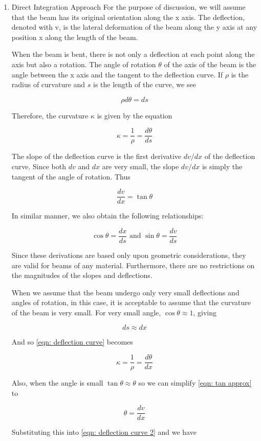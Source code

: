 \documentclass[a4paper,openany,12pt]{book}
\begin{document}
\begin{enumerate}
\item Direct Integration Approach
\label{direct-integration-approach}
For the purpose of discussion, we will assume that the beam has its
original orientation along the x axis. The deflection, denoted with v,
is the lateral deformation of the beam along the y axis at any position
x along the length of the beam.

When the beam is bent, there is not only a deflection at each point
along the axis but also a rotation. The angle of rotation \(\theta\) of
the axis of the beam is the angle between the x axis and the tangent to
the deflection curve. If \(\rho\) is the radius of curvature and \(s\) is
the length of the curve, we see


$$\rho d\theta  = ds$$

Therefore, the curvature \(\kappa\) is given by the equation

$$ \kappa  = \frac{1}{\rho } = \frac{d\theta }{ds}$$

The slope of the deflection curve is the first derivative \(dv/dx\) of the
deflection curve. Since both \(dv\) and \(dx\) are very small, the slope
\(dv/dx\) is simply the tangent of the angle of rotation. Thus

$$ \frac{dv}{dx} = \tan \theta$$

In similar manner, we also obtain the following relationships:

$$\cos \theta  = \frac{dx}{ds} \text{ and } \sin \theta  = \frac{dv}{ds}$$

Since these derivations are based only upon geometric considerations,
they are valid for beams of any material. Furthermore, there are no
restrictions on the magnitudes of the slopes and deflections.

When we assume that the beam undergo only very small deflections and
angles of rotation, in this case, it is acceptable to assume that the
curvature of the beam is very small. For very small angle,
\(\cos\theta \approx 1\), giving

$$ds \approx dx$$

And so \ref{eqn: deflection curve} becomes

$$ \kappa  = \frac{1}{\rho } = \frac{d\theta }{dx}$$

Also, when the angle is small \(\tan\theta \approx \theta\) so we can
simplify \ref{eqn: tan approx} to

$$\theta  = \frac{dv}{dx}$$

Substituting this into \ref{eqn: deflection curve 2} and we have


\end{enumerate}
\end{document}

